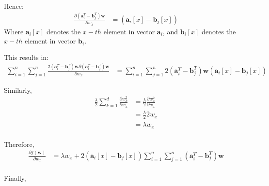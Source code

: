 \documentclass[12pt]{article}
\begin{document}
\begin{enumerate}[label=(\alph*)]
Hence:
\begin{equation}
\begin{matrix}
    \frac{
    \partial{(\boldsymbol{a}_i^T - \boldsymbol{b}_j^T)\boldsymbol{w}}}
        {\partial{w_x}} &= (\boldsymbol{a}_i[x] - \boldsymbol{b}_j[x])
\end{matrix}
\end{equation}
Where \(\boldsymbol{a}_i[x]\) denotes the \(x-th\) element in vector \(\boldsymbol{a}_i\), and \(\boldsymbol{b}_i[x]\) denotes the \(x-th\) element in vector \(\boldsymbol{b}_i\).

This results in:
\begin{equation}
\begin{matrix}
    \sum_{i=1}^{n}\sum_{j=1}^{n}
        \frac{2(\boldsymbol{a}_i^T - \boldsymbol{b}_j^T)\boldsymbol{w} \partial{(\boldsymbol{a}_i^T - \boldsymbol{b}_j^T)\boldsymbol{w}}}
        {\partial{w_x}} &=
        \sum_{i=1}^{n}\sum_{j=1}^{n}
        2(\boldsymbol{a}_i^T - \boldsymbol{b}_j^T)\boldsymbol{w}
        (\boldsymbol{a}_i[x] - \boldsymbol{b}_j[x])
\end{matrix}
\end{equation}

Similarly,
\begin{equation}
\begin{matrix}
    \frac{\lambda}{2}\sum_{k=1}^{d}\frac{\partial{w_k^2}}
        {\partial{w_x}}
    &= \frac{\lambda}{2}\frac{\partial{w_x^2}}
        {\partial{w_x}} \\
    &= \frac{\lambda}{2}2w_x \\
    &= \lambda w_x \\
\end{matrix}
\end{equation}

Therefore,
\begin{equation}
\begin{matrix}
    \frac{\partial{f(\boldsymbol{w})}}{\partial{w_x}} &=
        \lambda w_x +
        2(\boldsymbol{a}_i[x] - \boldsymbol{b}_j[x])\sum_{i=1}^{n}\sum_{j=1}^{n}
        (\boldsymbol{a}_i^T - \boldsymbol{b}_j^T)\boldsymbol{w} \\
\end{matrix}
\end{equation}

Finally,
\begin{equation}
\begin{matrix}


\end{matrix}
\end{equation}
\end{enumerate}
\end{document}
